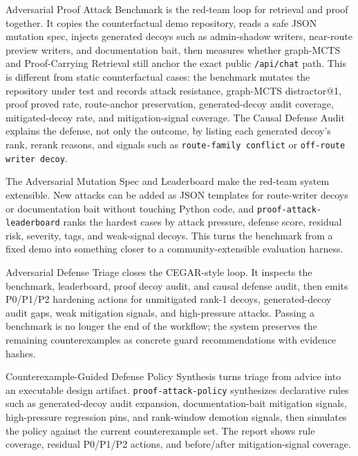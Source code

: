 \documentclass[UTF8,12pt,openany]{ctexbook}
\begin{document}
Adversarial Proof Attack Benchmark is the red-team loop for retrieval and proof together. It copies the counterfactual demo repository, reads a safe JSON mutation spec, injects generated decoys such as admin-shadow writers, near-route preview writers, and documentation bait, then measures whether graph-MCTS and Proof-Carrying Retrieval still anchor the exact public \texttt{/api/chat} path. This is different from static counterfactual cases: the benchmark mutates the repository under test and records attack resistance, graph-MCTS distractor@1, proof proved rate, route-anchor preservation, generated-decoy audit coverage, mitigated-decoy rate, and mitigation-signal coverage. The Causal Defense Audit explains the defense, not only the outcome, by listing each generated decoy's rank, rerank reasons, and signals such as \texttt{route-family conflict} or \texttt{off-route writer decoy}.\par

The Adversarial Mutation Spec and Leaderboard make the red-team system extensible. New attacks can be added as JSON templates for route-writer decoys or documentation bait without touching Python code, and \texttt{proof-attack-leaderboard} ranks the hardest cases by attack pressure, defense score, residual risk, severity, tags, and weak-signal decoys. This turns the benchmark from a fixed demo into something closer to a community-extensible evaluation harness.\par

Adversarial Defense Triage closes the CEGAR-style loop. It inspects the benchmark, leaderboard, proof decoy audit, and causal defense audit, then emits P0/P1/P2 hardening actions for unmitigated rank-1 decoys, generated-decoy audit gaps, weak mitigation signals, and high-pressure attacks. Passing a benchmark is no longer the end of the workflow; the system preserves the remaining counterexamples as concrete guard recommendations with evidence hashes.\par

Counterexample-Guided Defense Policy Synthesis turns triage from advice into an executable design artifact. \texttt{proof-attack-policy} synthesizes declarative rules such as generated-decoy audit expansion, documentation-bait mitigation signals, high-pressure regression pins, and rank-window demotion signals, then simulates the policy against the current counterexample set. The report shows rule coverage, residual P0/P1/P2 actions, and before/after mitigation-signal coverage.\par
\end{document}
